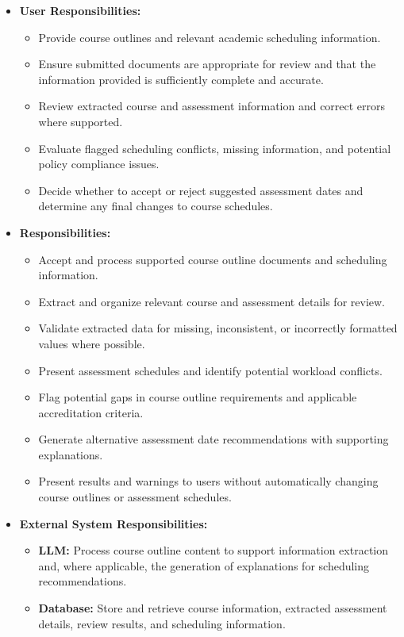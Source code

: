 \documentclass[12pt]{article}
\begin{document}
\begin{itemize}
    \item \textbf{User Responsibilities:}
    \begin{itemize}
        \item Provide course outlines and relevant academic scheduling information.
        \item Ensure submitted documents are appropriate for review and that the information provided is sufficiently complete and accurate.
        \item Review extracted course and assessment information and correct errors where supported.
        \item Evaluate flagged scheduling conflicts, missing information, and potential policy compliance issues.
        \item Decide whether to accept or reject suggested assessment dates and determine any final changes to course schedules.
    \end{itemize}

    \item \textbf{\progname{} Responsibilities:}
    \begin{itemize}
        \item Accept and process supported course outline documents and scheduling information.
        \item Extract and organize relevant course and assessment details for review.
        \item Validate extracted data for missing, inconsistent, or incorrectly formatted values where possible.
        \item Present assessment schedules and identify potential workload conflicts.
        \item Flag potential gaps in course outline requirements and applicable accreditation criteria.
        \item Generate alternative assessment date recommendations with supporting explanations.
        \item Present results and warnings to users without automatically changing course outlines or assessment schedules.
    \end{itemize}

    \item \textbf{External System Responsibilities:}
    \begin{itemize}
        \item \textbf{LLM:} Process course outline content to support information extraction and, where applicable, the generation of explanations for scheduling recommendations.
        \item \textbf{Database:} Store and retrieve course information, extracted assessment details, review results, and scheduling information.
    \end{itemize}
\end{itemize}
\end{document}
